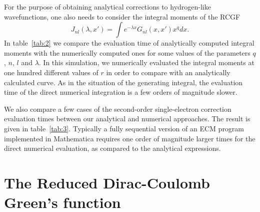 For the purpose of obtaining analytical corrections to hydrogen-like wavefunctions, one also needs to consider the integral moments of the RCGF
\begin{equation} \label{Gmoment}
    J_{nl}(\lambda, x') = \int e^{-\lambda x} G_{nl}(x,x')x^{q} dx.
\end{equation}
In table~\ref{tab:2} we compare the evaluation time of analytically
computed integral moments with the numerically computed ones for some
values of the parameters $q$, $n$, $l$ and $\lambda$. In this
simulation, we numerically evaluated the integral moments at one
hundred different values of $r$ in order to compare with an
analytically calculated curve. As in the situation of the generating
integral, the evaluation time of the direct numerical integration is a
few orders of magnitude slower.

We also
compare a few cases of the second-order single-electron correction evaluation times between our analytical and
numerical approaches. The result is given in table~\ref{tab:3}. Typically a
fully sequential version of an ECM program implemented in Mathematica
requires one order of magnitude larger times for the direct numerical
evaluation, as compared to the analytical expressions.

\section{The Reduced Dirac-Coulomb Green's function}

